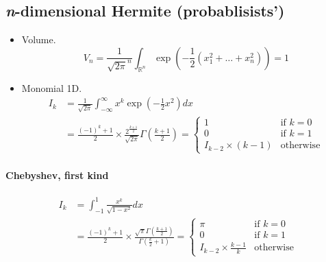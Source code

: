 \documentclass[draft]{scrartcl}
\begin{document}
\subsection*{\textit{n}-dimensional Hermite (probablisists')}
\begin{itemize}
  \item Volume.
\[
  V_n = \frac{1}{\sqrt{2\pi}^n} \int_{\mathbb{R}^n}
  \exp\left(-\frac{1}{2}(x_1^2+\dots+x_n^2)\right) = 1
\]

  \item Monomial 1D.
\[
  \begin{split}
I_k
    &= \frac{1}{\sqrt{2\pi}} \int_{-\infty}^\infty x^k \exp\left(-\frac{1}{2}x^2\right) dx\\
    &= \frac{(-1)^k + 1}{2} \times \frac{2^{\frac{k+1}{2}}}{\sqrt{2\pi}}
    \Gamma\left(\frac{k+1}{2}\right)
    = \begin{cases}
      1&\text{if $k = 0$}\\
      0&\text{if $k = 1$}\\
      I_{k-2} \times (k-1)&\text{otherwise}
    \end{cases}
  \end{split}
\]
\end{itemize}

\paragraph{Chebyshev, first kind}

\[
  \begin{split}
    I_k
    &= \int_{-1}^1 \frac{x^k}{\sqrt{1 - x^2}} dx\\
    &= \frac{(-1)^k + 1}{2} \times \frac{\sqrt{\pi} \Gamma(\frac{k+1}{2})}{\Gamma(\frac{k}{2} + 1)}
    = \begin{cases}
      \pi&\text{if $k = 0$}\\
      0&\text{if $k = 1$}\\
      I_{k-2} \times \frac{k-1}{k}&\text{otherwise}
    \end{cases}
  \end{split}
\]
\end{document}
